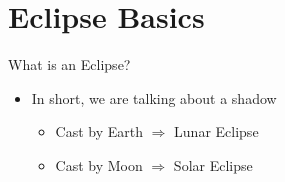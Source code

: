 \documentclass[pdf, aspectratio=169]{beamer}
\begin{document}
\section{Eclipse Basics}

\begin{frame}{What is an Eclipse?}
	\begin{itemize}
		\item In short, we are talking about a shadow
			\begin{itemize}
				\item Cast by Earth $\Rightarrow$ Lunar Eclipse
				\item Cast by Moon $\Rightarrow$ Solar Eclipse
			\end{itemize}
	\end{itemize}
	\begin{center}
	\end{center}
\end{frame}
\end{document}
